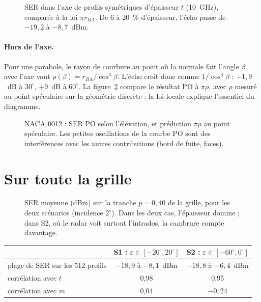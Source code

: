 \begin{figure}[htbp]
\centering

\caption{SER dans l'axe de profils symétriques d'épaisseur $t$ (10~GHz), comparée à la loi $\pi r_{BA}$. De 6 à 20~\% d'épaisseur, l'écho passe de $-19{,}2$ à $-8{,}7$~dBm.}\label{fig:rayon}
\end{figure}

\paragraph{Hors de l'axe.} Pour une parabole, le rayon de courbure au point où la normale fait l'angle $\beta$ avec l'axe vaut $\rho(\beta)=r_{BA}/\cos^3\beta$. L'écho croît donc comme $1/\cos^3\beta$ : $+1{,}9$~dB à $30^\circ$, $+9$~dB à $60^\circ$. La figure~\ref{fig:speculaire} compare le résultat PO à $\pi\rho$, avec $\rho$ mesuré au point spéculaire sur la géométrie discrète : la loi locale explique l'essentiel du diagramme.

\begin{figure}[htbp]
\centering

\caption{NACA 0012 : SER PO selon l'élévation, et prédiction $\pi\rho$ au point spéculaire. Les petites oscillations de la courbe PO sont des interférences avec les autres contributions (bord de fuite, faces).}\label{fig:speculaire}
\end{figure}

\section{Sur toute la grille}
\begin{figure}[htbp]
\centering

\caption{SER moyenne (dBm) sur la tranche $p=0{,}40$ de la grille, pour les deux scénarios (incidence $2^\circ$). Dans les deux cas, l'épaisseur domine ; dans S2, où le radar voit surtout l'intrados, la cambrure compte davantage.}\label{fig:cartes}
\end{figure}

\begin{center}
\begin{tabular}{lcc}
\toprule
 & S1 : $\varepsilon\in[-20^\circ,20^\circ]$ & S2 : $\varepsilon\in[-60^\circ,0^\circ]$ \\
\midrule
plage de SER sur les 512 profils & $-18{,}9$ à $-8{,}1$~dBm & $-18{,}8$ à $-6{,}4$~dBm \\
corrélation avec $t$ & 0,98 & 0,95 \\
corrélation avec $m$ & 0,04 & $-0{,}24$ \\
\bottomrule
\end{tabular}
\end{center}

